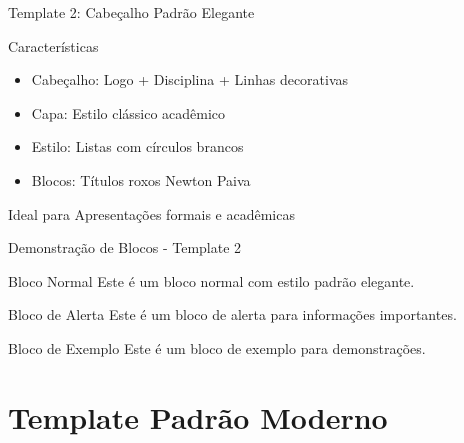 \documentclass[aspectratio=169]{beamer}
\begin{document}
\begin{frame}{Template 2: Cabeçalho Padrão Elegante}
    \begin{block}{Características}
        \begin{itemize}
            \item Cabeçalho: Logo + Disciplina + Linhas decorativas
            \item Capa: Estilo clássico acadêmico
            \item Estilo: Listas com círculos brancos
            \item Blocos: Títulos roxos Newton Paiva
        \end{itemize}
    \end{block}
    
    \begin{exampleblock}{Ideal para}
        Apresentações formais e acadêmicas
    \end{exampleblock}
\end{frame}

\begin{frame}{Demonstração de Blocos - Template 2}
    \begin{block}{Bloco Normal}
        Este é um bloco normal com estilo padrão elegante.
    \end{block}
    
    \begin{alertblock}{Bloco de Alerta}
        Este é um bloco de alerta para informações importantes.
    \end{alertblock}
    
    \begin{exampleblock}{Bloco de Exemplo}
        Este é um bloco de exemplo para demonstrações.
    \end{exampleblock}
\end{frame}


\section{Template Padrão Moderno}
\end{document}
